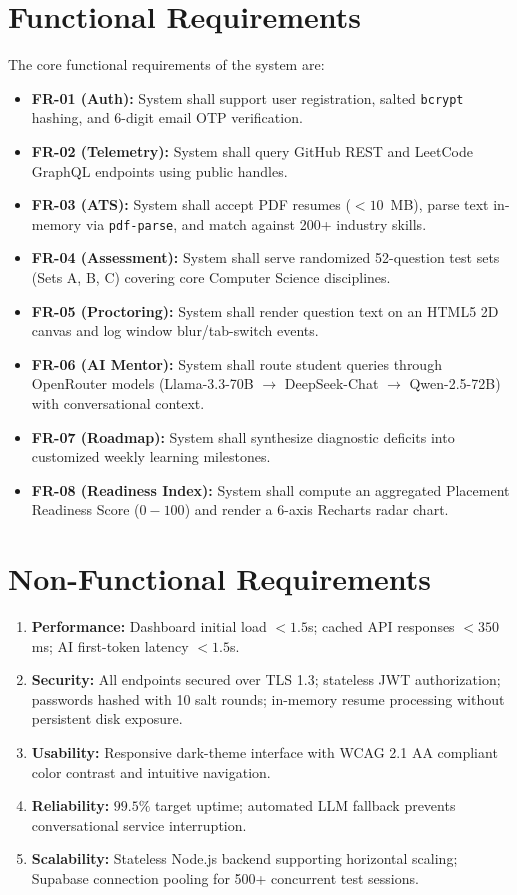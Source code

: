 \documentclass[12pt,a4paper]{report}
\begin{document}
\section{Functional Requirements}
The core functional requirements of the system are:
\begin{itemize}
    \item \textbf{FR-01 (Auth):} System shall support user registration, salted \texttt{bcrypt} hashing, and 6-digit email OTP verification.
    \item \textbf{FR-02 (Telemetry):} System shall query GitHub REST and LeetCode GraphQL endpoints using public handles.
    \item \textbf{FR-03 (ATS):} System shall accept PDF resumes ($<10$~MB), parse text in-memory via \texttt{pdf-parse}, and match against 200+ industry skills.
    \item \textbf{FR-04 (Assessment):} System shall serve randomized 52-question test sets (Sets A, B, C) covering core Computer Science disciplines.
    \item \textbf{FR-05 (Proctoring):} System shall render question text on an HTML5 2D canvas and log window blur/tab-switch events.
    \item \textbf{FR-06 (AI Mentor):} System shall route student queries through OpenRouter models (Llama-3.3-70B $\rightarrow$ DeepSeek-Chat $\rightarrow$ Qwen-2.5-72B) with conversational context.
    \item \textbf{FR-07 (Roadmap):} System shall synthesize diagnostic deficits into customized weekly learning milestones.
    \item \textbf{FR-08 (Readiness Index):} System shall compute an aggregated Placement Readiness Score ($0-100$) and render a 6-axis Recharts radar chart.
\end{itemize}

\section{Non-Functional Requirements}
\begin{enumerate}
    \item \textbf{Performance:} Dashboard initial load $<1.5$s; cached API responses $<350$ms; AI first-token latency $<1.5$s.
    \item \textbf{Security:} All endpoints secured over TLS 1.3; stateless JWT authorization; passwords hashed with 10 salt rounds; in-memory resume processing without persistent disk exposure.
    \item \textbf{Usability:} Responsive dark-theme interface with WCAG 2.1 AA compliant color contrast and intuitive navigation.
    \item \textbf{Reliability:} $99.5\%$ target uptime; automated LLM fallback prevents conversational service interruption.
    \item \textbf{Scalability:} Stateless Node.js backend supporting horizontal scaling; Supabase connection pooling for 500+ concurrent test sessions.
\end{enumerate}
\end{document}
